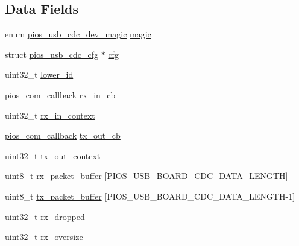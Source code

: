 \subsection*{\-Data \-Fields}
\begin{DoxyCompactItemize}
\item 
enum \hyperlink{group___p_i_o_s___u_s_b___c_o_m_gab4c476b0e464c59dcf6eadec015a87b8}{pios\-\_\-usb\-\_\-cdc\-\_\-dev\-\_\-magic} \hyperlink{group___p_i_o_s___u_s_b___c_o_m_gaf1f80b904c24c3a9d91aa7c8d9f0e0f7}{magic}
\item 
struct \hyperlink{structpios__usb__cdc__cfg}{pios\-\_\-usb\-\_\-cdc\-\_\-cfg} $\ast$ \hyperlink{group___p_i_o_s___u_s_b___c_o_m_gac129f3ba21ca6cb9ff92da45033acbbb}{cfg}
\item 
uint32\-\_\-t \hyperlink{group___p_i_o_s___u_s_b___c_o_m_ga5431d5544be717a197964da5a3b08d2a}{lower\-\_\-id}
\item 
\hyperlink{group___p_i_o_s___c_o_m_ga23f1888821f1f74a50c02adc459df597}{pios\-\_\-com\-\_\-callback} \hyperlink{group___p_i_o_s___u_s_b___c_o_m_gaf3cf777f785d8b2a117c736064e859de}{rx\-\_\-in\-\_\-cb}
\item 
uint32\-\_\-t \hyperlink{group___p_i_o_s___u_s_b___c_o_m_gae98fcbb800c5655c05106c1e73a1de01}{rx\-\_\-in\-\_\-context}
\item 
\hyperlink{group___p_i_o_s___c_o_m_ga23f1888821f1f74a50c02adc459df597}{pios\-\_\-com\-\_\-callback} \hyperlink{group___p_i_o_s___u_s_b___c_o_m_ga1e9a79d782c5671d5e35aafe776632f3}{tx\-\_\-out\-\_\-cb}
\item 
uint32\-\_\-t \hyperlink{group___p_i_o_s___u_s_b___c_o_m_ga81d00c55fe107bb853a8629706b0acb4}{tx\-\_\-out\-\_\-context}
\item 
uint8\-\_\-t \hyperlink{group___p_i_o_s___u_s_b___c_o_m_ga82f6a571f9bf92fae2d7368be2407a27}{rx\-\_\-packet\-\_\-buffer} \mbox{[}\-P\-I\-O\-S\-\_\-\-U\-S\-B\-\_\-\-B\-O\-A\-R\-D\-\_\-\-C\-D\-C\-\_\-\-D\-A\-T\-A\-\_\-\-L\-E\-N\-G\-T\-H\mbox{]}
\item 
uint8\-\_\-t \hyperlink{group___p_i_o_s___u_s_b___c_o_m_ga1b086465e042517001948516cfa908d1}{tx\-\_\-packet\-\_\-buffer} \mbox{[}\-P\-I\-O\-S\-\_\-\-U\-S\-B\-\_\-\-B\-O\-A\-R\-D\-\_\-\-C\-D\-C\-\_\-\-D\-A\-T\-A\-\_\-\-L\-E\-N\-G\-T\-H-\/1\mbox{]}
\item 
uint32\-\_\-t \hyperlink{group___p_i_o_s___u_s_b___c_o_m_gaf423c6fd8c8e8d95b5dc5d9242df40da}{rx\-\_\-dropped}
\item 
uint32\-\_\-t \hyperlink{group___p_i_o_s___u_s_b___c_o_m_ga88576a84665e4d9b17001b7cb5efebc6}{rx\-\_\-oversize}

\end{DoxyCompactItemize}
